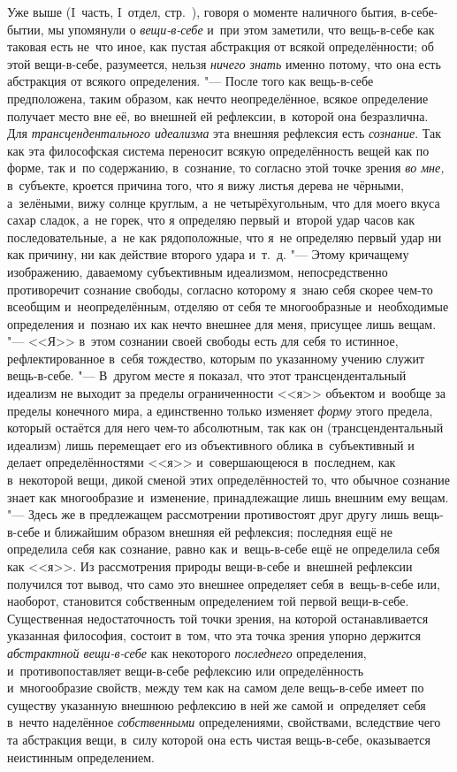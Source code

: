 Уже выше (I~часть, I~отдел, стр.~\pageref{bkm:bmThingInItself}), говоря о
моменте наличного бытия, в-себе-бытии, мы упомянули о
{\em вещи-в-себе} и~при этом заметили, что вещь-в-себе
как таковая есть не~что иное, как пустая абстракция от всякой
определённости; об этой вещи-в-себе, разумеется, нельзя
{\em ничего знать} именно потому, что она есть
абстракция от всякого определения. "--- После того как вещь-в-себе
предположена, таким образом, как нечто неопределённое, всякое определение
получает место вне её, во внешней ей рефлексии, в~которой она безразлична.
Для {\em трансцендентального идеализма} эта внешняя
рефлексия есть {\em сознание}. Так как эта философская
система переносит всякую определённость вещей как по форме, так и~по
содержанию, в~сознание, то согласно этой точке зрения
{\em во мне,} в~субъекте, кроется причина того, что я
вижу листья дерева не чёрными, а~зелёными, вижу солнце круглым, а~не
четырёхугольным, что для моего вкуса сахар сладок, а~не горек, что я
определяю первый и~второй удар часов как последовательные, а~не как
рядоположные, что я~не определяю первый удар ни как причину, ни как
действие второго удара и~т.~д. "--- Этому кричащему изображению, даваемому
субъективным идеализмом, непосредственно противоречит сознание свободы,
согласно которому я~знаю себя скорее чем-то всеобщим и~неопределённым,
отделяю от себя те многообразные и~необходимые определения и~познаю их как
нечто внешнее для меня, присущее лишь вещам. "--- <<Я>> в~этом сознании своей
свободы есть для себя то истинное, рефлектированное в~себя тождество,
которым по указанному учению служит вещь-в-себе. "--- В~другом месте я
показал, что этот трансцендентальный идеализм не выходит за пределы
ограниченности <<я>> объектом и~вообще за пределы конечного мира, а
единственно только изменяет {\em форму} этого предела,
который остаётся для него чем-то абсолютным, так как он (трансцендентальный
идеализм) лишь перемещает его из объективного облика в~субъективный и
делает определённостями <<я>> и~совершающеюся в~последнем, как в~некоторой
вещи, дикой сменой этих определённостей то, что обычное сознание знает как
многообразие и~изменение, принадлежащие лишь внешним ему вещам. "--- Здесь же
в предлежащем рассмотрении противостоят друг другу лишь вещь-в-себе и
ближайшим образом внешняя ей рефлексия; последняя ещё не определила себя
как сознание, равно как и~вещь-в-себе ещё не определила себя как <<я>>. Из
рассмотрения природы вещи-в-себе и~внешней рефлексии получился тот вывод,
что само это внешнее определяет себя в~вещь-в-себе или, наоборот,
становится собственным определением той первой вещи-в-себе. Существенная
недостаточность той точки зрения, на которой останавливается указанная
философия, состоит в~том, что эта точка зрения упорно держится
{\em абстрактной вещи-в-себе} как некоторого
{\em последнего} определения, и~противопоставляет
вещи-в-себе рефлексию или определённость и~многообразие свойств, между тем
как на самом деле вещь-в-себе имеет по существу указанную внешнюю рефлексию
в ней же самой и~определяет себя в~нечто наделённое
{\em собственными} определениями, свойствами,
вследствие чего та абстракция вещи, в~силу которой она есть чистая
вещь-в-себе, оказывается неистинным определением.

